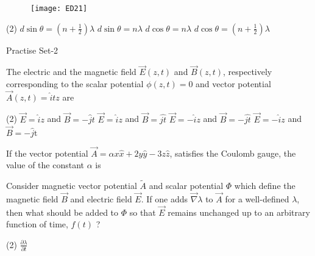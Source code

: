 \begin{enumerate}
{}
\begin{figure}[H]
	\centering
	\texttt{[image: ED21]}
\end{figure}
 \begin{tasks}(2)
	\task[\textbf{a.}]$d \sin \theta=\left(n+\frac{1}{2}\right) \lambda$
	\task[\textbf{b.}]$d \sin \theta=n \lambda$
	\task[\textbf{c.}] $d \cos \theta=n \lambda$
	\task[\textbf{d.}] $d \cos \theta=\left(n+\frac{1}{2}\right) \lambda$
\end{tasks}
\end{enumerate}



\newpage
\begin{abox}
	Practise Set-2
\end{abox}
\begin{enumerate}
	\begin{minipage}{\textwidth}
		\item  The electric and the magnetic field $\vec{E}(z, t)$ and $\vec{B}(z, t)$, respectively corresponding to the scalar potential $\phi(z, t)=0$ and vector potential $\vec{A}(z, t)=\hat{i} t z$ are
	\end{minipage}
	\begin{tasks}(2)
		\task[\textbf{A.}] $\vec{E}=\hat{i} z$ and $\vec{B}=-\hat{j} t$
		\task[\textbf{B.}]$\vec{E}=\hat{i} z$ and $\vec{B}=\hat{j t}$
		\task[\textbf{C.}]$\vec{E}=-\hat{i} z$ and $\vec{B}=-\hat{j t}$
		\task[\textbf{D.}]$\vec{E}=-\hat{i} z$ and $\vec{B}=-\hat{j} \mathrm{t}$
	\end{tasks}
	\begin{minipage}{\textwidth}
		\item If the vector potential $\vec{A}=\alpha x \hat{x}+2 y \hat{y}-3 z \hat{z}$, satisfies the Coulomb gauge, the value of the constant $\alpha$ is
	\end{minipage}
	\begin{minipage}{\textwidth}
		\item Consider magnetic vector potential $\tilde{A}$ and scalar potential $\Phi$ which define the magnetic field $\vec{B}$ and electric field $\vec{E}$. If one adds $\vec{\nabla} \lambda$ to $\vec{A}$ for a well-defined $\lambda$, then what should be added to $\Phi$ so that $\vec{E}$ remains unchanged up to an arbitrary function of time, $f(t)$ ?
	\end{minipage}
	\begin{tasks}(2)
		\task[\textbf{A.}] $\frac{\partial \lambda}{\partial t}$

\end{tasks}
\end{enumerate}
